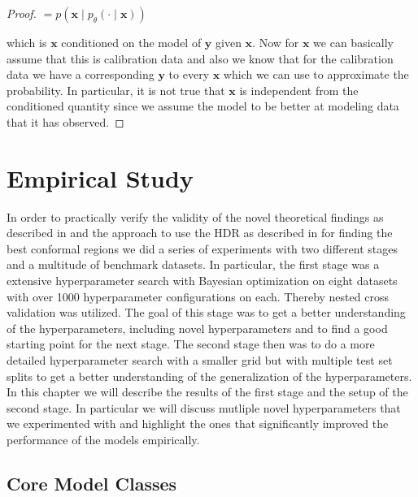 \begin{proof}
    $= p(\mathbf{x}\mid p_{\theta}(\cdot \mid \mathbf{x}))$

    which is $\mathbf{x}$ conditioned on the model of $\mathbf{y}$ given $\mathbf{x}$. Now for $\mathbf{x}$ we can basically assume that this is calibration data and also we know that for the calibration data we have a corresponding $\mathbf{y}$ to every $\mathbf{x}$ which we can use to approximate the probability. In particular, it is not true that $\mathbf{x}$ is independent from the conditioned quantity since we assume the model to be better at modeling data that it has observed. 

\end{proof}

\chapter{Empirical Study}\label{chap:empirical_study}

In order to practically verify the validity of the novel theoretical findings as described in \pef{} and the approach to use the HDR as described in \pef{} for finding the best conformal regions we did a series of experiments with two different stages and a multitude of benchmark datasets. In particular, the first stage was a extensive hyperparameter search with Bayesian optimization on eight datasets with over 1000 hyperparameter configurations on each. Thereby nested cross validation was utilized. The goal of this stage was to get a better understanding of the hyperparameters, including novel hyperparameters and to find a good starting point for the next stage. The second stage then was to do a more detailed hyperparameter search with a smaller grid but with multiple test set splits to get a better understanding of the generalization of the hyperparameters. In this chapter we will describe the results of the first stage and the setup of the second stage. In particular we will discuss mutliple novel hyperparameters that we experimented with and highlight the ones that significantly improved the performance of the models empirically.

\section{Core Model Classes}\label{sec:core_model_classes}

